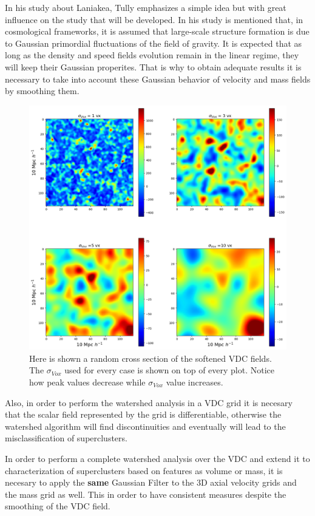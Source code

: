 In his study about Laniakea, Tully\cite{tully_laniakea_2014} emphasizes a simple idea but with great influence on the study that will be developed. In his study is mentioned that, in cosmological frameworks, it is assumed that large-scale structure formation is due to Gaussian primordial fluctuations of the field of gravity. It is expected that as long as the density and speed fields evolution remain in the linear regime, they will keep their Gaussian properites. That is why to obtain adequate results it is necessary to take into account these Gaussian behavior of velocity and mass fields by smoothing them.
\begin{figure}[!h]
    \centering
    \includegraphics[width=380pt]{SigmasVDC.png}
    \caption{Here is shown  a random cross section of the softened VDC fields. The $\sigma_{Vox}$ used for every case is shown on top of every plot. Notice how peak values decrease while $\sigma_{Vox}$ value increases.}
    \label{fig:SigmasVDCZcut}
\end{figure}
Also, in order to perform the watershed analysis in a VDC grid it is necesary that the scalar field represented by the grid is differentiable, otherwise the watershed algorithm will find discontinuities and eventually will lead to the misclassification of superclusters.

In order to perform a complete watershed analysis over the VDC and extend it to characterization of superclusters based on features as volume or mass,  it is necesary to apply the  \textbf{same} Gaussian Filter to the 3D axial velocity grids and the mass grid as well. This in order to have consistent measures despite the smoothing of the VDC field.



